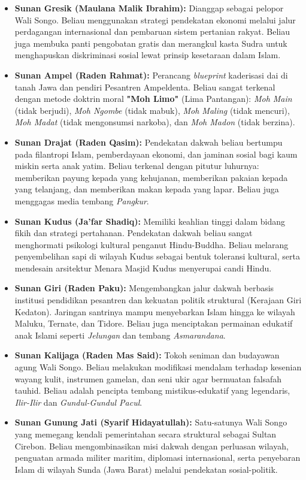 \documentclass[12pt, a4paper]{article}
\begin{document}
\begin{itemize}[leftmargin=*]
    \item \textbf{Sunan Gresik (Maulana Malik Ibrahim):} Dianggap sebagai pelopor Wali Songo. Beliau menggunakan strategi pendekatan ekonomi melalui jalur perdagangan internasional dan pembaruan sistem pertanian rakyat. Beliau juga membuka panti pengobatan gratis dan merangkul kasta Sudra untuk menghapuskan diskriminasi sosial lewat prinsip kesetaraan dalam Islam.
    
    \item \textbf{Sunan Ampel (Raden Rahmat):} Perancang \textit{blueprint} kaderisasi dai di tanah Jawa dan pendiri Pesantren Ampeldenta. Beliau sangat terkenal dengan metode doktrin moral \textbf{"Moh Limo"} (Lima Pantangan): \textit{Moh Main} (tidak berjudi), \textit{Moh Ngombe} (tidak mabuk), \textit{Moh Maling} (tidak mencuri), \textit{Moh Madat} (tidak mengonsumsi narkoba), dan \textit{Moh Madon} (tidak berzina).
    
    \item \textbf{Sunan Drajat (Raden Qasim):} Pendekatan dakwah beliau bertumpu pada filantropi Islam, pemberdayaan ekonomi, dan jaminan sosial bagi kaum miskin serta anak yatim. Beliau terkenal dengan pitutur luhurnya: memberikan payung kepada yang kehujanan, memberikan pakaian kepada yang telanjang, dan memberikan makan kepada yang lapar. Beliau juga menggagas media tembang \textit{Pangkur}.
    
    \item \textbf{Sunan Kudus (Ja'far Shadiq):} Memiliki keahlian tinggi dalam bidang fikih dan strategi pertahanan. Pendekatan dakwah beliau sangat menghormati psikologi kultural penganut Hindu-Buddha. Beliau melarang penyembelihan sapi di wilayah Kudus sebagai bentuk toleransi kultural, serta mendesain arsitektur Menara Masjid Kudus menyerupai candi Hindu.
    
    \item \textbf{Sunan Giri (Raden Paku):} Mengembangkan jalur dakwah berbasis institusi pendidikan pesantren dan kekuatan politik struktural (Kerajaan Giri Kedaton). Jaringan santrinya mampu menyebarkan Islam hingga ke wilayah Maluku, Ternate, dan Tidore. Beliau juga menciptakan permainan edukatif anak Islami seperti \textit{Jelungan} dan tembang \textit{Asmarandana}.
    
    \item \textbf{Sunan Kalijaga (Raden Mas Said):} Tokoh seniman dan budayawan agung Wali Songo. Beliau melakukan modifikasi mendalam terhadap kesenian wayang kulit, instrumen gamelan, dan seni ukir agar bermuatan falsafah tauhid. Beliau adalah pencipta tembang mistikus-edukatif yang legendaris, \textit{Ilir-Ilir} dan \textit{Gundul-Gundul Pacul}.
    
    \item \textbf{Sunan Gunung Jati (Syarif Hidayatullah):} Satu-satunya Wali Songo yang memegang kendali pemerintahan secara struktural sebagai Sultan Cirebon. Beliau mengombinasikan misi dakwah dengan perluasan wilayah, penguatan armada militer maritim, diplomasi internasional, serta penyebaran Islam di wilayah Sunda (Jawa Barat) melalui pendekatan sosial-politik.
\end{itemize}
\end{document}
